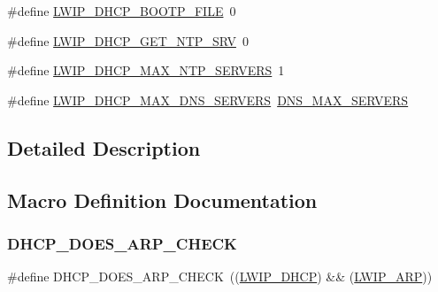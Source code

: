 \begin{DoxyCompactItemize}
\item 
\#define \hyperlink{group__lwip__opts__dhcp_ga3c2983cbd228011dd3e18cb417e7e423}{L\+W\+I\+P\+\_\+\+D\+H\+C\+P\+\_\+\+B\+O\+O\+T\+P\+\_\+\+F\+I\+LE}~0
\item 
\#define \hyperlink{group__lwip__opts__dhcp_ga2cc18315edcd5ffc083d1256f7d22a83}{L\+W\+I\+P\+\_\+\+D\+H\+C\+P\+\_\+\+G\+E\+T\+\_\+\+N\+T\+P\+\_\+\+S\+RV}~0
\item 
\#define \hyperlink{group__lwip__opts__dhcp_ga9d014e3f7dc9e1e7c7decd8652ba65e2}{L\+W\+I\+P\+\_\+\+D\+H\+C\+P\+\_\+\+M\+A\+X\+\_\+\+N\+T\+P\+\_\+\+S\+E\+R\+V\+E\+RS}~1
\item 
\#define \hyperlink{group__lwip__opts__dhcp_ga60ccc20fbb08be24b5d5f599dd47a6a6}{L\+W\+I\+P\+\_\+\+D\+H\+C\+P\+\_\+\+M\+A\+X\+\_\+\+D\+N\+S\+\_\+\+S\+E\+R\+V\+E\+RS}~\hyperlink{group__lwip__opts__dns_ga9f9881c887a8aceb9765820c2dbdf292}{D\+N\+S\+\_\+\+M\+A\+X\+\_\+\+S\+E\+R\+V\+E\+RS}
\end{DoxyCompactItemize}


\subsection{Detailed Description}


\subsection{Macro Definition Documentation}
\mbox{\label{group__lwip__opts__dhcp_gab2d91de7b2fce879b0a213682e1b0b69}} 
\subsubsection{\texorpdfstring{D\+H\+C\+P\+\_\+\+D\+O\+E\+S\+\_\+\+A\+R\+P\+\_\+\+C\+H\+E\+CK}{DHCP\_DOES\_ARP\_CHECK}\hspace{0.1cm}{\footnotesize\ttfamily [1/2]}}
{\footnotesize\ttfamily \#define D\+H\+C\+P\+\_\+\+D\+O\+E\+S\+\_\+\+A\+R\+P\+\_\+\+C\+H\+E\+CK~((\hyperlink{openmote-cc2538_2lwip_2test_2unit_2lwipopts_8h_a8a6ec62dc121064ac591b1fd8567bee9}{L\+W\+I\+P\+\_\+\+D\+H\+CP}) \&\& (\hyperlink{group__lwip__opts__arp_ga9609a014bba4638cc191d6a8f9556c87}{L\+W\+I\+P\+\_\+\+A\+RP}))}

